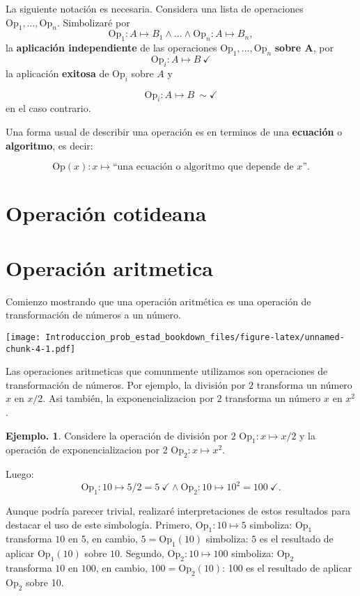 \documentclass[]{book}
\theoremstyle{definition}
\theoremstyle{definition}
\newtheorem{example}{Ejemplo.}[chapter]
\theoremstyle{definition}
\theoremstyle{remark}
\begin{document}
La siguiente notación es necesaria. Considera una lista de
operaciones \(\mbox{Op}_1, \ldots, \mbox{Op}_n\). Simbolizaré por
\[  \mbox{Op}_1: A \mapsto  B_1 \wedge \ldots \wedge  
   \mbox{Op}_n: A  \mapsto B_n,  \]
la \textbf{aplicación independiente} de las
operaciones \(\mbox{Op}_1, \ldots, \mbox{Op}_n\) \textbf{sobre A}, por
\[  \mbox{Op}_i: A \mapsto B \ \checkmark \]
la aplicación \textbf{exitosa} de \(\mbox{Op}_i\) sobre \(A\) y

\[  \mbox{Op}_i: A \mapsto B \ \sim\checkmark \]
en el caso contrario.

Una forma usual de describir una operación es en terminos de una
\textbf{ecuación} o \textbf{algoritmo}, es decir:

\[ \mbox{Op}(x): x \mapsto \mbox{``una ecuación o algoritmo que depende de $x$''.}   \]

\hypertarget{operaciuxf3n-cotideana}{%
\section*{Operación cotideana}\label{operaciuxf3n-cotideana}}

\hypertarget{operaciuxf3n-aritmetica}{%
\section*{Operación aritmetica}\label{operaciuxf3n-aritmetica}}

Comienzo mostrando que una operación aritmética
es una operación de transformación de números a un número.

\texttt{[image: Introduccion\_prob\_estad\_bookdown\_files/figure-latex/unnamed-chunk-4-1.pdf]}

Las operaciones aritmeticas que comunmente utilizamos son
operaciones de transformación de números. Por ejemplo, la división
por \(2\) transforma un número \(x\) en \(x/2\). Asi también, la
exponencializacion por \(2\) transforma un número \(x\) en \(x^2\).

\begin{example}
\protect\hypertarget{exm:unnamed-chunk-5}{}{\label{exm:unnamed-chunk-5} }
Considere la operación de
división por \(2\) \(\mbox{Op}_1: x \mapsto x/2\) y la operación
de exponencializacion por \(2\) \(\mbox{Op}_2: x \mapsto x^2\).

Luego: \[ \mbox{Op}_1: 10 \mapsto 5/2= 5 \ \checkmark \wedge
          \mbox{Op}_2: 10 \mapsto 10^2  =100 \ \checkmark. \]

Aunque podría parecer trivial, realizaré
interpretaciones de estos resultados para destacar el uso de este
simbología. Primero, \(\mbox{Op}_1: 10 \mapsto 5\) simboliza:
\(\mbox{Op}_1\) transforma \(10\) en \(5\), en cambio,
\(5 = \mbox{Op}_1(10)\) simboliza: \(5\) es el resultado de
aplicar \(\mbox{Op}_1(10)\) sobre \(10\). Segundo,
\(\mbox{Op}_2: 10 \mapsto 100\) simboliza: \(\mbox{Op}_2\)\\
transforma \(10\) en \(100\), en cambio, \(100=\mbox{Op}_2(10)\): 100
es el resultado de aplicar \(\mbox{Op}_2\) sobre 10.
\end{example}
\end{document}
